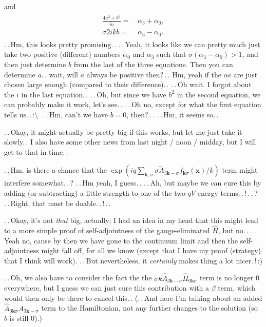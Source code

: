\documentclass{report}
\begin{document}
and
\begin{align}
\begin{aligned}
	\frac{4 a^2 + b^2}{\tilde m} =&\, \alpha_3 + \alpha_0,\\
	\sigma  2 i k b =&\, \alpha_3 - \alpha_0.
\end{aligned}
\end{align}
.\,.\,Hm, this looks pretty promising.\,. .\,.\,Yeah, it looks like we can pretty much just take two positive (different) numbers $\alpha_0$ and $\alpha_3$ such that $\sigma(\alpha_3-\alpha_0)>1$, and then just determine $b$ from the last of the three equations. Then you can determine $a$.\,. wait, will $a$ always be positive then?\,.\,. Hm, yeah if the $\alpha$s are just chosen large enough (compared to their difference).\,. .\,.\,Oh wait. I forgot about the $i$ in the last equation.\,. .\,.\,Oh, but since we have $b^2$ in the second equation, we can probably make it work, let's see.\,. .\,.\,Oh no, except for what the first equation tells us.\,.\,:\textbackslash\ \,.\,.\,Hm, can't we have $b=0$, then?\,.\,. .\,.\,Hm, it seems so.\,. 

.\,.\,Okay, it might actually be pretty big if this works, but let me just take it slowly.\,. I also have some other news from last night / noon / midday, but I will get to that in time.\,. %

.\,.\,Hm, is there a chance that the 
$\exp(
	i q \sum_{\boldsymbol{k}, \sigma} \sigma \tilde A_{3\boldsymbol{k}-\sigma} 
	f_{\boldsymbol{k}\sigma}(\boldsymbol{x}) / k
)$ 
term might interfere somewhat.\,.\,? .\,.\,Hm yeah, I guess.\,. .\,.\,Ah, but maybe we can cure this by adding (or subtracting) a little strength to one of the two $qV$ energy terms.\,.\,!\,.\,.\,? %
.\,.\,Right, that must be doable.\,.\,!\,.\,. 

.\,.\,Okay, it's not \emph{that} big, actually; I had an idea in my head that this might lead to a more simple proof of self-adjointness of the gauge-eliminated $\hat H$, but no.\,. .\,.\,Yeah no, cause by then we have gone to the continuum limit and then the self-adjointness might fall off, for all we know (except that I have my proof (strategy) that I think will work). .\,.\,But nevertheless, it \emph{certainly} makes thing a lot nicer.\,!\,:) %

.\,.\,Oh, we also have to consider the fact the the $\sigma k \hat{A}_{3 \boldsymbol k -\sigma} \hat \Pi_{0 \boldsymbol k \sigma}$ term is no longer 0 everywhere, but I guess we can just cure this contribution with a $\beta$ term, which would then only be there to cancel this.\,. %
(.\,.\,And here I'm talking about an added $\hat{A}_{0 \boldsymbol k \sigma} \hat{A}_{3 \boldsymbol k -\sigma}$ term to the Hamiltonian, not any further changes to the solution (so $b$ is still 0).)
\end{document}
